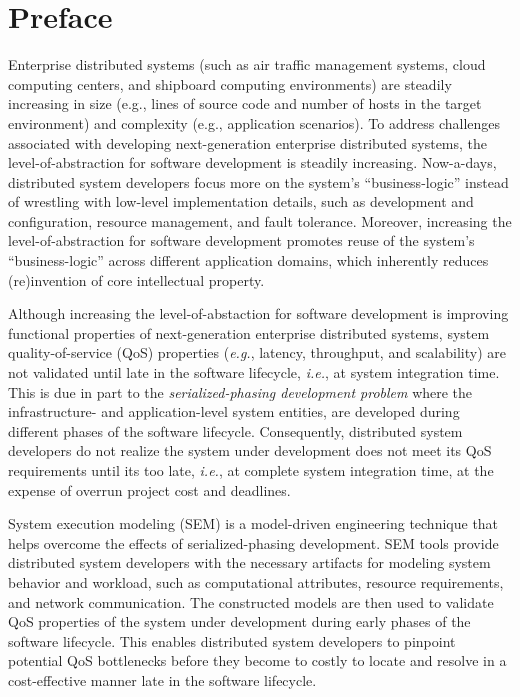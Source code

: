 
\chapter*{Preface}
\label{sec:preface}

Enterprise distributed systems (such as air traffic management 
systems, cloud computing centers, and shipboard computing 
environments) are steadily increasing in size (e.g., lines of 
source code and number of hosts in the target environment) and 
complexity (e.g., application scenarios). To address challenges 
associated with developing next-generation enterprise distributed 
systems, the level-of-abstraction for software development is 
steadily increasing. Now-a-days, distributed system developers 
focus more on the system's ``business-logic'' instead of wrestling
with low-level implementation details, such as development and 
configuration, resource management, and fault tolerance. Moreover, 
increasing the level-of-abstraction for software development 
promotes reuse of the system's ``business-logic'' across different 
application domains, which inherently reduces (re)invention of 
core intellectual property.

Although increasing the level-of-abstaction for software development 
is improving functional properties of next-generation enterprise 
distributed systems, system quality-of-service (QoS) properties 
(\textit{e.g.}, latency, throughput, and scalability) are not 
validated until late in the software lifecycle, \textit{i.e.}, 
at system integration time. This is due in part to the 
\textit{serialized-phasing development problem} where the 
infrastructure- and application-level system entities, are 
developed during different phases of the software lifecycle. 
Consequently, distributed system developers do not realize the 
system under development does not meet its QoS requirements until 
its too late, \textit{i.e.}, at complete system integration time,
at the expense of overrun project cost and deadlines.

System execution modeling (SEM) is a model-driven engineering 
technique that helps overcome the effects of serialized-phasing 
development. SEM tools provide distributed system developers with 
the necessary artifacts for modeling system behavior and workload, 
such as computational attributes, resource requirements, and network 
communication. The constructed models are then used to validate QoS 
properties of the system under development during early phases of 
the software lifecycle. This enables distributed system developers
to pinpoint potential QoS bottlenecks before they become to costly 
to locate and resolve in a cost-effective manner late in the 
software lifecycle.

